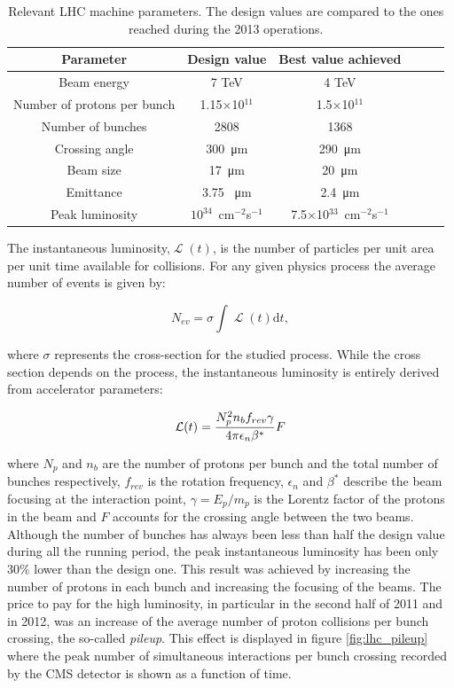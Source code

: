 \begin{table}[h!]
   \centering
  \caption{Relevant LHC machine parameters. The design values are compared to the ones reached during the 2013 operations.}
\begin{tabular}{c|ccccc}
\hline
Parameter & Design value&  Best value achieved \\ 
\hline
Beam energy   & 7 TeV & 4 TeV \\ 
Number of protons per bunch & 1.15$\times$10$^{11}$ & 1.5$\times$10$^{11}$ \\
Number of bunches & 2808 & 1368 \\
Crossing angle & 300~\si{\micro\metre} & 290~\si{\micro\metre} \\
Beam size & 17~\si{\micro\metre} & 20~\si{\micro\metre} \\
Emittance & 3.75 ~\si{\micro\metre} & 2.4~\si{\micro\metre}  \\
Peak luminosity & $10^{34}$~cm$^{-2}$s$^{-1}$ & 7.5$\times$10$^{33}$~cm$^{-2}$s$^{-1}$ \\
\hline
\end{tabular}
  \label{tab:lhc_figures}                
\end{table}


The instantaneous luminosity,$\operatorname{\mathcal{L}}(t)$, is the number of particles per unit area per unit time available for collisions. For any given physics process the average number of events is given by:

\begin{equation} 
	N_{ev} = \sigma\int\operatorname{\mathcal{L}}(t)\mathrm{d}t,
	\label{eq:n_events}
\end{equation} 

where $\sigma$ represents the cross-section for the studied process. While the cross section depends on the process, the instantaneous luminosity is entirely derived from accelerator parameters:

\begin{equation} 
	\operatorname{{\cal L}}(t) = \frac{N_p^2 n_b f_{rev} \gamma }{4 \pi \epsilon_{n} \beta^*} F
	\label{eq:lumi}
\end{equation} 

where $N_p$ and $n_b$ are the number of protons per bunch and the total number of bunches respectively, $f_{rev}$ is the rotation frequency, $\epsilon_{n}$ and $\beta^*$ describe the beam focusing at the interaction point, $\gamma = E_p / m_p$ is the Lorentz factor of the protons in the beam and $F$ accounts for the crossing angle between the two beams. Although the number of bunches has always been less than half the design value during all the running period, the peak instantaneous luminosity has been only 30\% lower than the design one. This result was achieved by increasing the number of protons in each bunch and increasing the focusing of the beams. The price to pay for the high luminosity, in particular in the second half of 2011 and in 2012, was an increase of the average number of proton collisions per bunch crossing, the so-called \emph{pileup}. This effect is displayed in figure \ref{fig:lhc_pileup} where the peak number of simultaneous interactions per bunch crossing recorded by the CMS detector is shown as a function of time.

